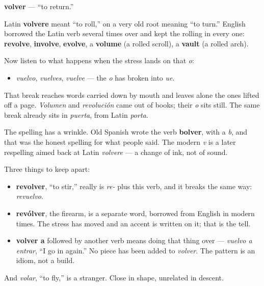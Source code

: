 \begin{cousinweb}
\textbf{volver} — \textquotedblleft{}to return.\textquotedblright{}

Latin \textbf{volvere} meant \textquotedblleft{}to roll,\textquotedblright{} on a very old root meaning \textquotedblleft{}to turn.\textquotedblright{} English borrowed the Latin verb several times over and kept the rolling in every one: \textbf{revolve}, \textbf{involve}, \textbf{evolve}, a \textbf{volume} (a rolled scroll), a \textbf{vault} (a rolled arch).

Now listen to what happens when the stress lands on that \emph{o}:

\begin{itemize}
\raggedright
  \item \emph{vuelvo}, \emph{vuelves}, \emph{vuelve} — the \emph{o} has broken into \emph{ue}.
\end{itemize}

That break reaches words carried down by mouth and leaves alone the ones lifted off a page. \emph{Volumen} and \emph{revolución} came out of books; their \emph{o} sits still. The same break already sits in \emph{puerta}, from Latin \emph{porta}.

The spelling has a wrinkle. Old Spanish wrote the verb \textbf{bolver}, with a \emph{b}, and that was the honest spelling for what people said. The modern \emph{v} is a later respelling aimed back at Latin \emph{volvere} — a change of ink, not of sound.

Three things to keep apart:

\begin{itemize}
\raggedright
  \item \textbf{revolver}, \textquotedblleft{}to stir,\textquotedblright{} really is \emph{re-} plus this verb, and it breaks the same way: \emph{revuelvo}.
  \item \textbf{revólver}, the firearm, is a separate word, borrowed from English in modern times. The stress has moved and an accent is written on it; that is the tell.
  \item \textbf{volver a} followed by another verb means doing that thing over — \emph{vuelvo a entrar}, \textquotedblleft{}I go in again.\textquotedblright{} No piece has been added to \emph{volver}. The pattern is an idiom, not a build.
\end{itemize}

And \emph{volar}, \textquotedblleft{}to fly,\textquotedblright{} is a stranger. Close in shape, unrelated in descent.
\end{cousinweb}

